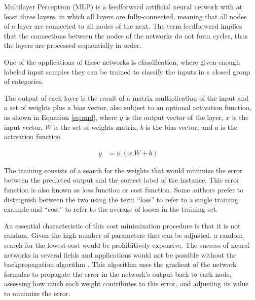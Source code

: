 Multilayer Perceptron (MLP) \cite{rosenblatt_perceptron:_1958} is a feedforward artificial neural network with at least three layers, in which all layers are fully-connected, meaning that all nodes of a layer are connected to all nodes of the next. The term feedforward implies that the connections between the nodes of the networks do not form cycles, thus the layers are processed sequentially in order.

One of the applications of these networks is classification, where given enough labeled input samples they can be trained to classify the inputs in a closed group of categories.

The output of each layer is the result of a matrix multiplication of the input and a set of weights plus a bias vector, also subject to an optional activation function, as shown in Equation \ref{eq:mpl}, where $y$ is the output vector of the layer, $x$ is the input vector, $W$ is the set of weights matrix, $b$ is the bias vector, and $a$ is the activation function.

\begin{align}
\label{eq:mpl}     
y &= a.(x.W + b)
\end{align}

The training consists of a search for the weights that would minimize the error between the predicted output and the correct label of the instance. This error function is also known as loss function or cost function. Some authors prefer to distinguish between the two using the term ``loss'' to refer to a single training example and ``cost'' to refer to the average of losses in the training set.


An essential characteristic of this cost minimization procedure is that it is not random. Given the high number of parameters that can be adjusted, a random search for the lowest cost would be prohibitively expensive.
The success of neural networks in several fields and applications would not be possible without the backpropagation algorithm \cite{rumelhart_general_1986}. 
This algorithm uses the gradient of the network formulas to propagate the error in the network's output back to each node, assessing how much each weight contributes to this error, and adjusting its value to minimize the error.


